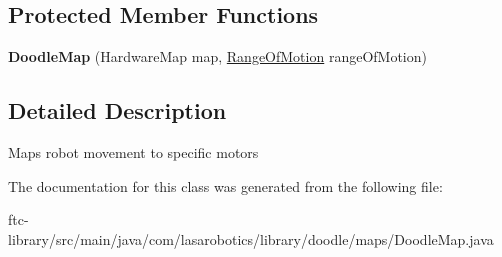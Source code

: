 \subsection*{Protected Member Functions}
\begin{DoxyCompactItemize}
\item 
\hypertarget{classcom_1_1lasarobotics_1_1library_1_1doodle_1_1maps_1_1_doodle_map_ab1170dd020d98201bce9be2a71f306e4}{}{\bfseries Doodle\+Map} (Hardware\+Map map, \hyperlink{enumcom_1_1lasarobotics_1_1library_1_1doodle_1_1maps_1_1_doodle_map_1_1_range_of_motion}{Range\+Of\+Motion} range\+Of\+Motion)\label{classcom_1_1lasarobotics_1_1library_1_1doodle_1_1maps_1_1_doodle_map_ab1170dd020d98201bce9be2a71f306e4}

\end{DoxyCompactItemize}


\subsection{Detailed Description}
Maps robot movement to specific motors 

The documentation for this class was generated from the following file\+:\begin{DoxyCompactItemize}
\item 
ftc-\/library/src/main/java/com/lasarobotics/library/doodle/maps/Doodle\+Map.\+java\end{DoxyCompactItemize}
